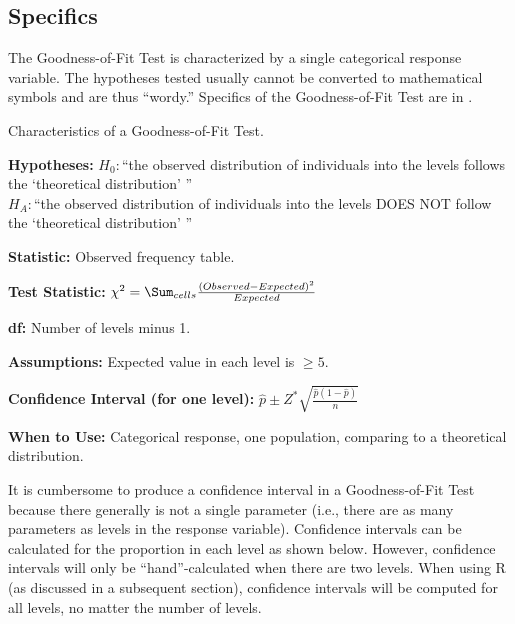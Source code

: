 \documentclass[10pt,openany]{book}\usepackage[]{graphicx}\usepackage[]{color}
\begin{document}
\subsection{Specifics}
\vspace{-12pt}
The Goodness-of-Fit Test is characterized by a single categorical response variable.  The hypotheses tested usually cannot be converted to mathematical symbols and are thus ``wordy.''  Specifics of the Goodness-of-Fit Test are in .

\begin{table}[h]
\centering
\colorbox{ltgray}{
\begin{minipage}{.8\textwidth}
  \centering
	\caption{Characteristics of a Goodness-of-Fit Test.}\label{tab:ChiGOFspec}
  \begin{Itemize}
      \item \textbf{Hypotheses:} $H_{0}:$``the observed distribution of individuals into the levels follows the `theoretical distribution' ''\\ $H_{A}:$``the observed distribution of individuals into the levels DOES NOT follow the `theoretical distribution' ''
      \item \textbf{Statistic:} Observed frequency table.
      \vspace{6pt}
      \item \textbf{Test Statistic:} $\chi^{2} = \Sum_{cells}\frac{(Observed-Expected)^{2}}{Expected}$
      \vspace{6pt}
      \item \textbf{df:} Number of levels minus 1.
      \item \textbf{Assumptions:} Expected value in each level is $\geq5$.
      \vspace{6pt}
      \item \textbf{Confidence Interval (for one level):} $\hat{p} \pm Z^{*}\sqrt{\frac{\hat{p}(1-\hat{p})}{n}}$
      \vspace{6pt}
      \item \textbf{When to Use:} Categorical response, one population, comparing to a theoretical distribution.
  \end{Itemize}
\end{minipage}}
\end{table}

It is cumbersome to produce a confidence interval in a Goodness-of-Fit Test because there generally is not a single parameter (i.e., there are as many parameters as levels in the response variable). Confidence intervals can be calculated for the proportion in each level as shown below. However, confidence intervals will only be ``hand''-calculated when there are two levels. When using R (as discussed in a subsequent section), confidence intervals will be computed for all levels, no matter the number of levels.
\end{document}
